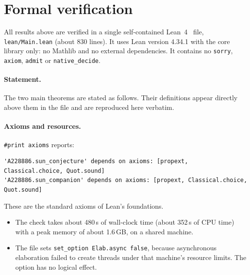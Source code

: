 \documentclass[11pt]{article}
\numberwithin{equation}{section}
\theoremstyle{definition}
\theoremstyle{remark}
\begin{document}
\section{Formal verification}\label{sec:lean}

All results above are verified in a single self-contained Lean~4~\cite{Lean4} file, \texttt{lean/Main.lean}
(about 830 lines). It uses Lean version 4.34.1 with the core library only: no Mathlib and no
external dependencies. It contains no \texttt{sorry}, \texttt{axiom}, \texttt{admit} or
\texttt{native\_decide}.

\paragraph{Statement.}
The two main theorems are stated as follows. Their definitions appear directly above them in the
file and are reproduced here verbatim.



\paragraph{Axioms and resources.}
\texttt{\#print axioms} reports:
\begin{lstlisting}[language={}]
'A228886.sun_conjecture' depends on axioms: [propext, Classical.choice, Quot.sound]
'A228886.sun_companion' depends on axioms: [propext, Classical.choice, Quot.sound]
\end{lstlisting}
These are the standard axioms of Lean's foundations.
\begin{itemize}
  \item The check takes about 480\,s of wall-clock time (about 352\,s of CPU time) with a peak
  memory of about 1.6\,GB, on a shared machine.
  \item The file sets \texttt{set\_option Elab.async false}, because asynchronous elaboration failed
  to create threads under that machine's resource limits. The option has no logical effect.
\end{itemize}
\end{document}
